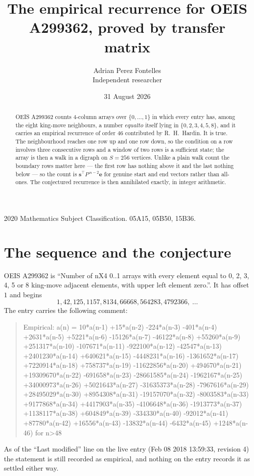 \documentclass[11pt,a4paper]{article}
\title{The empirical recurrence for OEIS A299362, proved by transfer matrix}
\author{Adrian Perez Fontelles\\ \small Independent researcher}
\date{31 August 2026}
\theoremstyle{plain}
\theoremstyle{definition}
\begin{document}
\maketitle

\begin{abstract}
OEIS A299362 counts $4$-column arrays over $\{0,\dots,1\}$ in which every entry has,
among the eight king-move neighbours, a number $equal to$ itself lying in $\{0,2,3,4,5,8\}$, and it carries an empirical
recurrence of order $46$ contributed by R.~H.~Hardin. It is true. The neighbourhood
reaches one row up and one row down, so the condition on a row involves three consecutive
rows and a window of two rows is a sufficient state; the array is then a walk in a digraph
on $S=256$ vertices. Unlike a plain walk count the boundary rows matter here --- the first
row has nothing above it and the last nothing below --- so the count is
$\mathbf{s}^{\!\top}P^{\,n-2}\mathbf{e}$ for genuine start and end vectors rather than
all-ones. The conjectured recurrence is then annihilated exactly, in integer arithmetic.
\end{abstract}

\noindent\small 2020 Mathematics Subject Classification. 05A15, 05B50, 15B36.\normalsize

\section{The sequence and the conjecture}

OEIS A299362 is ``Number of nX4 0..1 arrays with every element equal to 0, 2, 3, 4, 5 or 8 king-move adjacent elements, with upper left element zero.''. It has offset
$1$ and begins
\[
1, 42, 125, 1157, 8134, 66668, 564283, 4792366,\ \dots
\]
The entry carries the following comment:
\begin{quote}\small
Empirical: a(n) = 10*a(n-1) +15*a(n-2) -224*a(n-3) -401*a(n-4) +2631*a(n-5) +5221*a(n-6) -15126*a(n-7) -46122*a(n-8) +55260*a(n-9) +251317*a(n-10) -107671*a(n-11) -922100*a(n-12) -42547*a(n-13) +2401230*a(n-14) +640621*a(n-15) -4448231*a(n-16) -1361652*a(n-17) +7220914*a(n-18) +758737*a(n-19) -11622856*a(n-20) +494670*a(n-21) +19309670*a(n-22) -691658*a(n-23) -28661585*a(n-24) -1962167*a(n-25) +34000973*a(n-26) +5021643*a(n-27) -31635373*a(n-28) -7967616*a(n-29) +28495029*a(n-30) +8954308*a(n-31) -19157070*a(n-32) -8003583*a(n-33) +9177868*a(n-34) +4417903*a(n-35) -4106648*a(n-36) -1913773*a(n-37) +1138117*a(n-38) +604849*a(n-39) -334330*a(n-40) -92012*a(n-41) +87780*a(n-42) +16556*a(n-43) -13832*a(n-44) -6432*a(n-45) +1248*a(n-46) for n>48
\end{quote}
As of the ``Last modified'' line on the live entry (Feb 08 2018 13:59:33, revision
4) the statement is still recorded as empirical, and nothing on the entry
records it as settled either way.
\end{document}
